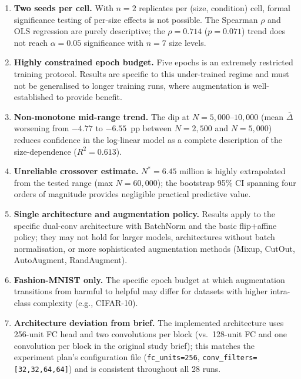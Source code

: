 \documentclass[11pt]{article}
\begin{document}
\begin{enumerate}[leftmargin=*, label=\arabic*.]
\item \textbf{Two seeds per cell.}
  With $n{=}2$ replicates per (size, condition) cell, formal significance testing
  of per-size effects is not possible.
  The Spearman $\rho$ and OLS regression are purely descriptive; the
  $\rho{=}0.714$ ($p{=}0.071$) trend does not reach $\alpha{=}0.05$
  significance with $n{=}7$ size levels.

\item \textbf{Highly constrained epoch budget.}
  Five epochs is an extremely restricted training protocol.
  Results are specific to this under-trained regime and must not be generalised
  to longer training runs, where augmentation is well-established to provide
  benefit.

\item \textbf{Non-monotone mid-range trend.}
  The dip at $N{=}5{,}000$--$10{,}000$ (mean $\bar\Delta$ worsening from
  $-4.77$ to $-6.55$~pp between $N{=}2{,}500$ and $N{=}5{,}000$) reduces
  confidence in the log-linear model as a complete description of the
  size-dependence ($R^2{=}0.613$).

\item \textbf{Unreliable crossover estimate.}
  $N^\ast{=}6.45$ million is highly extrapolated from the tested range
  (max $N{=}60{,}000$); the bootstrap 95\% CI spanning four orders of magnitude
  provides negligible practical predictive value.

\item \textbf{Single architecture and augmentation policy.}
  Results apply to the specific dual-conv architecture with BatchNorm and the
  basic flip+affine policy; they may not hold for larger models, architectures
  without batch normalisation, or more sophisticated augmentation methods
  (Mixup, CutOut, AutoAugment, RandAugment).

\item \textbf{Fashion-MNIST only.}
  The specific epoch budget at which augmentation transitions from harmful to
  helpful may differ for datasets with higher intra-class complexity (e.g.,
  CIFAR-10).

\item \textbf{Architecture deviation from brief.}
  The implemented architecture uses 256-unit FC head and two convolutions per
  block (vs.\ 128-unit FC and one convolution per block in the original study
  brief); this matches the experiment plan's configuration file
  (\texttt{fc\_units=256}, \texttt{conv\_filters=[32,32,64,64]}) and is
  consistent throughout all 28 runs.
\end{enumerate}
\end{document}
